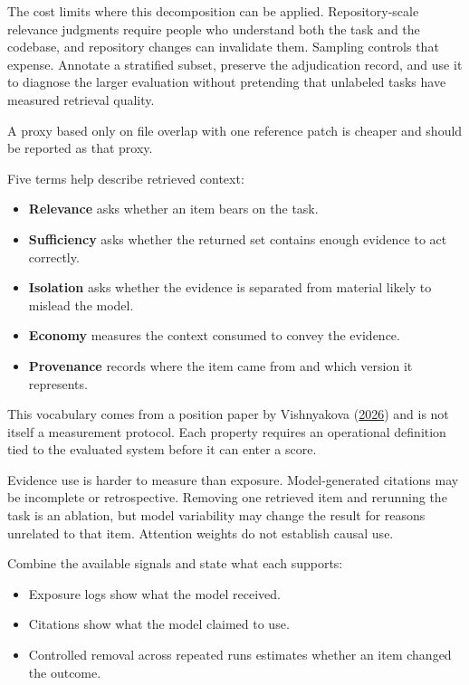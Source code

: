The cost limits where this decomposition can be applied. Repository-scale relevance judgments require people who understand both the task and the codebase, and repository changes can invalidate them. Sampling controls that expense. Annotate a stratified subset, preserve the adjudication record, and use it to diagnose the larger evaluation without pretending that unlabeled tasks have measured retrieval quality.

A proxy based only on file overlap with one reference patch is cheaper and should be reported as that proxy.


Five terms help describe retrieved context:

\begin{itemize}
\tightlist
\item
  \textbf{Relevance} asks whether an item bears on the task.
\item
  \textbf{Sufficiency} asks whether the returned set contains enough evidence to act correctly.
\item
  \textbf{Isolation} asks whether the evidence is separated from material likely to mislead the model.
\item
  \textbf{Economy} measures the context consumed to convey the evidence.
\item
  \textbf{Provenance} records where the item came from and which version it represents.
\end{itemize}

This vocabulary comes from a position paper by Vishnyakova (\href{https://arxiv.org/abs/2603.09619}{2026}) and is not itself a measurement protocol. Each property requires an operational definition tied to the evaluated system before it can enter a score.

Evidence use is harder to measure than exposure. Model-generated citations may be incomplete or retrospective. Removing one retrieved item and rerunning the task is an ablation, but model variability may change the result for reasons unrelated to that item. Attention weights do not establish causal use.


Combine the available signals and state what each supports:

\begin{itemize}
\tightlist
\item
  Exposure logs show what the model received.
\item
  Citations show what the model claimed to use.
\item
  Controlled removal across repeated runs estimates whether an item changed the outcome.
\end{itemize}

